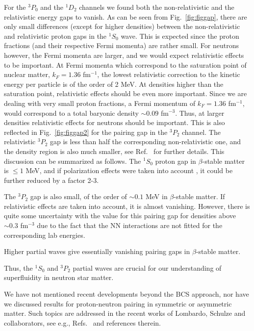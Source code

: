 For the $^3P_0$ and the $^1D_2$ channels we found both 
the non-relativistic and the relativistic
energy gaps to vanish. 
As can be seen from Fig.\ \ref{fig:figgap}, there are only small
differences (except for higher densities) between the non-relativistic
and relativistic proton gaps in the $^1S_0$ wave.
This is expected since the proton fractions (and their respective Fermi
momenta) are rather small.
For neutrons however, 
the Fermi momenta are larger, and we would 
expect relativistic effects to be important. At Fermi momenta
which correspond to the
saturation point of nuclear matter, $k_F=1.36$ fm$^{-1}$,
the lowest relativistic correction to the kinetic energy per 
particle is of the order of 2 MeV. 
At densities higher than the saturation
point, relativistic effects should be even 
more important.
Since we are dealing with
very small proton fractions, a Fermi momentum
of $k_F=1.36$ fm$^{-1}$, would correspond to a total baryonic 
density $\sim 0.09$  fm$^{-3}$. Thus, at larger densities 
relativistic effects for neutrons should
be important.
This is also reflected in Fig.\ \ref{fig:figgap2} for the pairing
gap in the $^3P_2$ channel.
The relativistic $^3P_2$ gap is less  than half
the corresponding non-relativistic one, and the 
density region is also much smaller, see Ref.\ \cite{eeho96} for further details.
This discussion  can be summarized as follows.
The $^1S_0$ proton gap in $\beta$-stable matter
            is $ \le 1$ MeV, and if polarization
            effects were taken into account \cite{sclbl96},
            it could be further reduced by a factor 2-3.

The $^3P_2$ gap is also small, of the order
            of $\sim 0.1$ MeV in $\beta$-stable matter.
            If relativistic effects are taken into account,
            it is almost vanishing. However, there is
            quite some uncertainty with the value for this
            pairing gap for densities above $\sim 0.3$
            fm$^{-3}$ due to the fact that the NN interactions
            are not fitted for the corresponding lab energies. 

Higher partial waves give essentially vanishing
            pairing gaps in $\beta$-stable matter.

Thus, the $^1S_0$ and $^3P_2$ partial waves are crucial for our
understanding of superfluidity in neutron star matter. 

We have not mentioned recent developments beyond the BCS approach,
nor have we discussed results for proton-neutron pairing in symmetric
or asymmetric matter. Such topics are addressed in the recent works
of Lombardo, Schulze and collaborators, see e.g., Refs.\ 
\cite{ls2000,ls2001} and references therein. 

